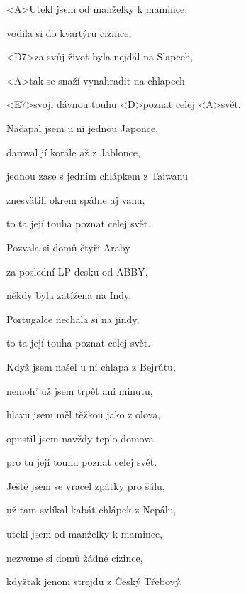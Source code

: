 

\zs
<A>Utekl jsem od manželky k mamince,

vodila si do kvartýru cizince,

<D7>za svůj život byla nejdál na Slapech,

<A>tak se snaží vynahradit na chlapech

<E7>svoji dávnou touhu <D>poznat celej <A>svět.
\ks

\zs
Načapal jsem u ní jednou Japonce,

daroval jí korále až z Jablonce,

jednou zase s jedním chlápkem z Taiwanu

znesvätili okrem spálne aj vanu,

to ta její touha poznat celej svět.
\ks

\zs
Pozvala si domů čtyři Araby

za poslední LP desku od ABBY,

někdy byla zatížena na Indy,

Portugalce nechala si na jindy,

to ta její touha poznat celej svět.
\ks

\zs
Když jsem našel u ní chlapa z Bejrútu,

nemoh' už jsem trpět ani minutu,

hlavu jsem měl těžkou jako z olova,

opustil jsem navždy teplo domova

pro tu její touhu poznat celej svět.
\ks

\zs
Ještě jsem se vracel zpátky pro šálu,

už tam svlíkal kabát chlápek z Nepálu,

utekl jsem od manželky k mamince,

nezveme si domů žádné cizince,

kdyžtak jenom strejdu z Český Třebový.
\ks

\kp
